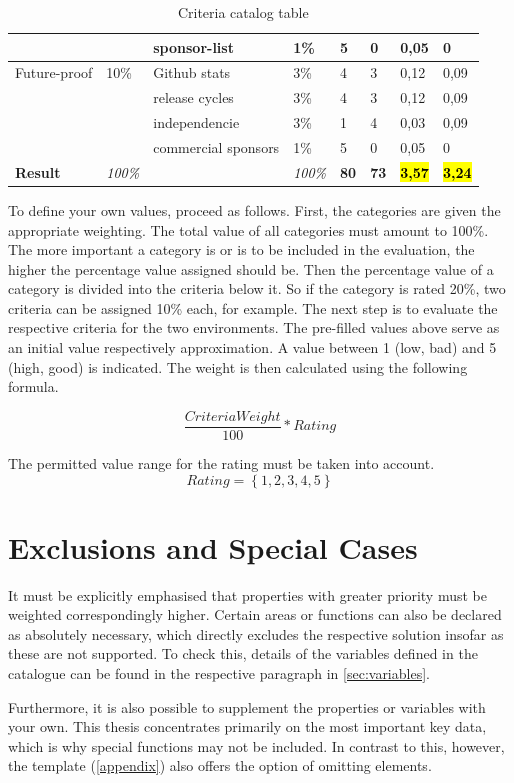 \documentclass[MSC,Master,english]{twbook}%
\begin{document}
\begin{table}[ht]
\begin{center}
{\begin{tabular}{|l|l|l|l|l|l|l|l|}
            & & sponsor-list & 1\% & 5 & 0 & 0,05 & 0 \\
            \hline
            Future-proof & 10\% & Github stats & 3\% & 4 & 3 & 0,12 & 0,09 \\
            & & release cycles & 3\% & 4 & 3 & 0,12 & 0,09 \\
            & & independencie & 3\% & 1 & 4 & 0,03 & 0,09 \\
            & & commercial sponsors & 1\% & 5 & 0 & 0,05 & 0 \\
            \hline \hline
            \textbf{Result} & \textit{100\%} & & \textit{100\%} & \textbf{80} & \textbf{73} & \hl{\textbf{3,57}} & \hl{\textbf{3,24}} \\
            \hline
        \end{tabular}}
        \caption{Criteria catalog table}
        \label{tab:cct}
    \end{center}
\end{table}
To define your own values, proceed as follows. First, the categories are given the appropriate weighting. The total value of all categories must amount to 100\%. The more important a category is or is to be included in the evaluation, the higher the percentage value assigned should be. Then the percentage value of a category is divided into the criteria below it. So if the category is rated 20\%, two criteria can be assigned 10\% each, for example. The next step is to evaluate the respective criteria for the two environments. The pre-filled values above serve as an initial value respectively approximation. A value between 1 (low, bad) and 5 (high, good) is indicated. The weight is then calculated using the following formula.

\begin{equation*}
    \frac{CriteriaWeight}{100}*Rating
\end{equation*}

The permitted value range for the rating must be taken into account.
\begin{equation*}
    Rating = \left\{1,2,3,4,5  \right\}
\end{equation*}

\section{Exclusions and Special Cases}
\label{sec:exclusions}
It must be explicitly emphasised that properties with greater priority must be weighted correspondingly higher. Certain areas or functions can also be declared as absolutely necessary, which directly excludes the respective solution insofar as these are not supported. To check this, details of the variables defined in the catalogue can be found in the respective paragraph in \autoref{sec:variables}. \par
Furthermore, it is also possible to supplement the properties or variables with your own. This thesis concentrates primarily on the most important key data, which is why special functions may not be included. In contrast to this, however, the template (\autoref{appendix}) also offers the option of omitting elements.
\end{document}
